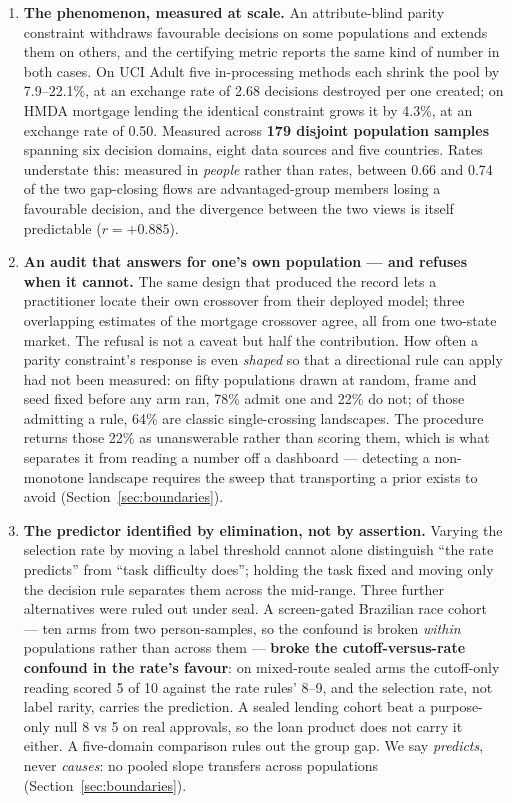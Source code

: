 \documentclass[conference]{IEEEtran}
\begin{document}
\begin{enumerate}
\item \textbf{The phenomenon, measured at scale.} An attribute-blind parity constraint
withdraws favourable decisions on some populations and extends them on others, and the
certifying metric reports the same kind of number in both cases. On UCI Adult five
in-processing methods each shrink the pool by 7.9--22.1\%, at an exchange rate of 2.68
decisions destroyed per one created; on HMDA mortgage lending the identical constraint grows
it by 4.3\%, at an exchange rate of 0.50. Measured across \textbf{179 disjoint population
samples} spanning six decision domains, eight data sources and five countries. Rates understate this: measured in \emph{people} rather than rates, between 0.66 and
0.74 of the two gap-closing flows are advantaged-group members losing a favourable decision, and the
divergence between the two views is itself predictable ($r = +0.885$).

\item \textbf{An audit that answers for one's own population --- and refuses when it
cannot.} The same design that produced the record lets a practitioner locate their own
crossover from their deployed model; three overlapping estimates of the mortgage crossover
agree, all from one two-state market. The refusal is not a caveat but half the contribution.
How often a parity constraint's response is even \emph{shaped} so that a directional rule
can apply had not been measured: on fifty populations drawn at random, frame and seed fixed
before any arm ran, 78\% admit one and 22\% do not; of those admitting a rule, 64\% are classic
single-crossing landscapes. The procedure returns those 22\% as unanswerable rather than
scoring them, which is what separates it from reading a number off a dashboard --- detecting
a non-monotone landscape requires the sweep that transporting a prior exists to avoid
(Section~\ref{sec:boundaries}).

\item \textbf{The predictor identified by elimination, not by assertion.} Varying the
selection rate by moving a label threshold cannot alone distinguish ``the rate predicts''
from ``task difficulty does''; holding the task fixed and moving only the decision rule
separates them across the mid-range. Three further alternatives were ruled out under seal.
A screen-gated Brazilian race cohort --- ten arms from two person-samples, so the confound
is broken \emph{within} populations rather than across them --- \textbf{broke the
cutoff-versus-rate confound in the rate's favour}: on mixed-route sealed arms the
cutoff-only reading scored 5 of 10 against the rate rules' 8--9, and the selection rate,
not label rarity, carries the prediction. A sealed lending cohort beat a purpose-only null
8 vs 5 on real approvals, so the loan product does not carry it either. A five-domain
comparison rules out the group gap. We say \emph{predicts}, never \emph{causes}: no pooled
slope transfers across populations (Section~\ref{sec:boundaries}).


\end{enumerate}
\end{document}
